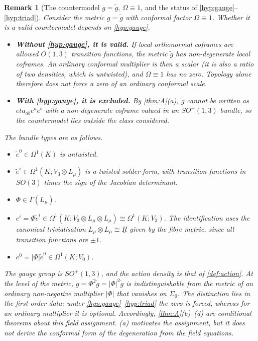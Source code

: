 \documentclass[11pt]{article}
\theoremstyle{canonmath}
\newtheorem{remark}[theorem]{Remark}
\theoremstyle{canonpostulate}
\theoremstyle{canonproposition}
\theoremstyle{canonmath}
\theoremstyle{canonproposition}
\providecommand{\Lmu}{\mathcal{L}_\mu}
\providecommand{\Vb}{\mathcal{V}}
\providecommand{\Klein}{\mathcal{K}}
\providecommand{\R}{\mathbb{R}}
\def\mathrm#1{#1}%
\def\mathbb#1{#1}%
\def\mathcal#1{#1}%
\def\eta{eta}%
\begin{document}
\begin{remark}[The countermodel $g=\tilde g$, $\Omega\equiv1$, and the status of \ref{hyp:gauge}--\ref{hyp:triad}]\label{rem:countermodel}
Consider the metric $g=\tilde g$ with conformal factor $\Omega\equiv1$. Whether it is a valid countermodel depends on \ref{hyp:gauge}.
\begin{itemize}
\item \textbf{Without \ref{hyp:gauge}, it is valid.} If local orthonormal coframes are allowed $\mathrm{O}(1,3)$ transition functions, the metric $\tilde g$ has non-degenerate local coframes. An ordinary conformal multiplier is then a scalar (it is also a ratio of two densities, which is untwisted), and $\Omega\equiv1$ has no zero. Topology alone therefore does \emph{not} force a zero of an ordinary conformal scale.
\item \textbf{With \ref{hyp:gauge}, it is excluded.} By \cref{thm:A}(a), $\tilde g$ cannot be written as $\eta_{ab}e^ae^b$ with a non-degenerate coframe valued in an $SO^+(1,3)$ bundle, so the countermodel lies outside the class considered.
\end{itemize}
The bundle types are as follows.
\begin{itemize}
\item $\tilde e^0\in\Omega^1(\Klein)$ is untwisted.
\item $\tilde e^i\in\Omega^1(\Klein;\Vb_3\otimes\Lmu)$ is a twisted solder form, with transition functions in $SO(3)$ times the sign of the Jacobian determinant.
\item $\Phi\in\Gamma(\Lmu)$.
\item $e^i = \Phi\tilde e^i\in\Omega^1(\Klein;\Vb_3\otimes\Lmu\otimes\Lmu)\cong\Omega^1(\Klein;\Vb_3)$. The identification uses the canonical trivialisation $\Lmu\otimes\Lmu\cong\underline{\R}$ given by the fibre metric, since all transition functions are $\pm1$.
\item $e^0 = |\Phi|\tilde e^0\in\Omega^1(\Klein;\Vb_0)$.
\end{itemize}
The gauge group is $SO^+(1,3)$, and the action density is that of \cref{def:action}. At the level of the metric, $g = \Phi^2\tilde g = |\Phi|^2\tilde g$ is indistinguishable from the metric of an ordinary non-negative multiplier $|\Phi|$ that vanishes on $\Sigma_0$. The distinction lies in the first-order data: under \ref{hyp:gauge}--\ref{hyp:triad} the zero is forced, whereas for an ordinary multiplier it is optional. Accordingly, \cref{thm:A}(b)--(d) are \emph{conditional} theorems about this field assignment. (a) motivates the assignment, but it does not derive the conformal form of the degeneration from the field equations.
\end{remark}
\end{document}
